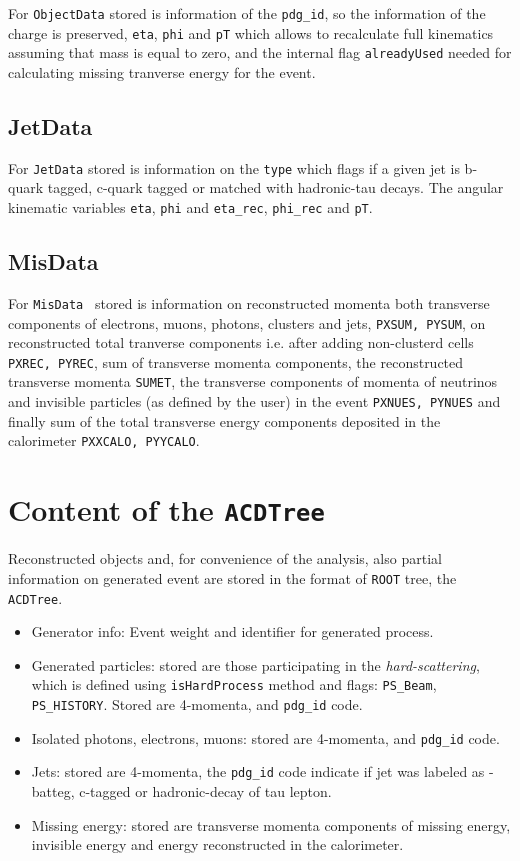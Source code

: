 For  {\tt ObjectData} stored is information of the {\tt pdg\_id}, 
so the information of the charge is preserved, {\tt eta}, {\tt phi} and {\tt pT}
which allows to recalculate full kinematics assuming that mass is equal to zero, 
and the internal flag  {\tt alreadyUsed} needed for calculating missing tranverse 
energy for the event. 

\subsection{ JetData }

For {\tt JetData} stored is information on the {\tt type} which flags if a given
jet is b-quark tagged, c-quark tagged or matched with hadronic-tau decays.
The angular kinematic variables {\tt eta}, {\tt phi} and {\tt eta\_rec}, {\tt phi\_rec}
and {\tt pT}.  

\subsection{ MisData }

For {\tt MisData } stored is information on reconstructed momenta both transverse
components of electrons, muons, photons, clusters and jets, {\tt PXSUM, PYSUM}, on reconstructed
total tranverse components i.e.
after adding non-clusterd cells  {\tt PXREC, PYREC}, sum of transverse momenta components, 
the reconstructed transverse momenta {\tt SUMET}, the transverse components of momenta 
of neutrinos and invisible particles (as defined by the user) in the event {\tt PXNUES, PYNUES}
and finally sum of the total transverse energy components deposited in the
calorimeter {\tt PXXCALO, PYYCALO}.

\section{Content of the {\tt ACDTree} }

Reconstructed objects and, for convenience of the analysis, also partial information on 
generated event are stored in the format of {\tt ROOT} tree, the {\tt ACDTree}.

\begin{itemize}
\item
Generator info: Event weight and identifier for generated process.
\item
Generated particles: stored are those participating in the {\it hard-scattering},
which is defined using {\tt isHardProcess} method and  flags: {\tt PS\_Beam}, {\tt PS\_HISTORY}.
Stored are 4-momenta, and {\tt pdg\_id} code. 
\item
Isolated photons, electrons, muons: stored are 4-momenta, and {\tt pdg\_id} code. 
\item
Jets:  stored are 4-momenta, the {\tt pdg\_id} code indicate if jet was labeled as -batteg, c-tagged 
or hadronic-decay of tau lepton.
\item
Missing energy: stored are transverse momenta components of missing energy, invisible energy
and energy reconstructed in the calorimeter.
\end{itemize}

